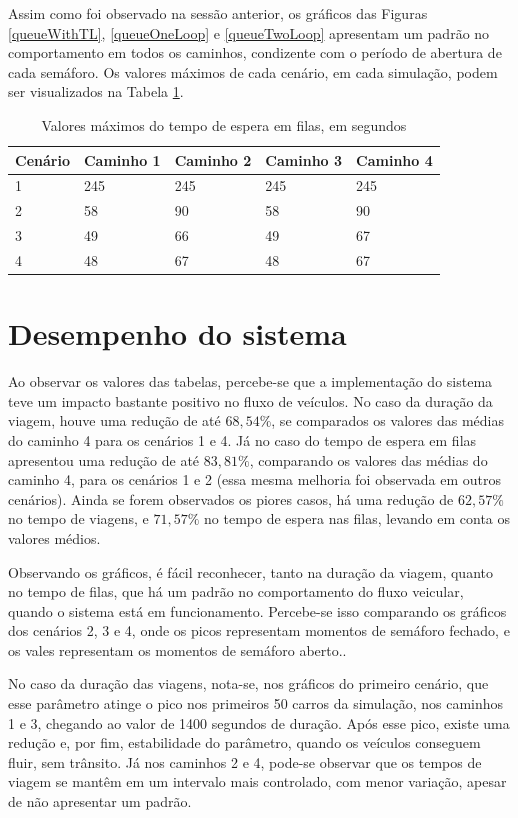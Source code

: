 Assim como foi observado na sessão anterior, os gráficos das Figuras \ref{queueWithTL}, \ref{queueOneLoop} e \ref{queueTwoLoop} apresentam um padrão no comportamento em todos os caminhos, condizente com o período de abertura de cada semáforo. Os valores máximos de cada cenário, em cada simulação, podem ser visualizados na Tabela \ref{tab: queueMax}.

\begin{table}[H]
\centering
\caption{Valores máximos do tempo de espera em filas, em segundos}
\label{tab: queueMax}
\begin{tabular}{@{}lllll@{}}
\toprule
Cenário & Caminho 1 & Caminho 2 & Caminho 3 & Caminho 4 \\ \midrule
1 & 245 & 245 & 245 & 245 \\
2 & 58 & 90 & 58 & 90 \\
3 &	49 & 66 & 49 & 67 \\
4 & 48 & 67 & 48 & 67 \\
\bottomrule
\end{tabular}
\end{table}

\section{Desempenho do sistema}

Ao observar os valores das tabelas, percebe-se que a implementação do sistema teve um impacto bastante positivo no fluxo de veículos. No caso da duração da viagem, houve uma redução de até $68,54\%$, se comparados os valores das médias do caminho 4 para os cenários 1 e 4. Já no caso do tempo de espera em filas apresentou uma redução de até $83,81\%$, comparando os valores das médias do caminho 4, para os cenários 1 e 2 (essa mesma melhoria foi observada em outros cenários). Ainda se forem observados os piores casos, há uma redução de $62,57\%$ no tempo de viagens, e $71,57\%$ no tempo de espera nas filas, levando em conta os valores médios.

Observando os gráficos, é fácil reconhecer, tanto na duração da viagem, quanto no tempo de filas, que há um padrão no comportamento do fluxo veicular, quando o sistema está em funcionamento. Percebe-se isso comparando os gráficos dos cenários 2, 3 e 4, onde os picos representam momentos de semáforo fechado, e os vales representam os momentos de semáforo aberto.. 

No caso da duração das viagens, nota-se, nos gráficos do primeiro cenário, que esse parâmetro atinge o pico nos primeiros 50 carros da simulação, nos caminhos 1 e 3, chegando ao valor de 1400 segundos de duração. Após esse pico, existe uma redução e, por fim, estabilidade do parâmetro, quando os veículos conseguem fluir, sem trânsito.
Já nos caminhos 2 e 4, pode-se observar que os tempos de viagem se mantêm em um intervalo mais controlado, com menor variação, apesar de não apresentar um padrão.

